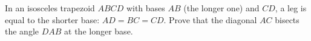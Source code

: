 In an isosceles trapezoid $ABCD$ with bases $AB$ (the longer one) and $CD$, a leg is equal to the shorter base: $AD=BC=CD$. Prove that the diagonal $AC$ bisects the angle $DAB$ at the longer base.
